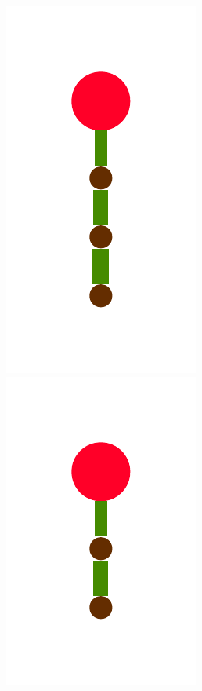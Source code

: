 \documentclass[a4paper,10pt]{article}
\begin{document}
\begin{figure}
{    \includegraphics[scale=.2]{../figures/vector/4-2-3-recursion-post-5.pdf}
    \includegraphics[scale=.2]{../figures/vector/4-2-3-recursion-post-6.pdf}
}
\end{figure}
\end{document}
